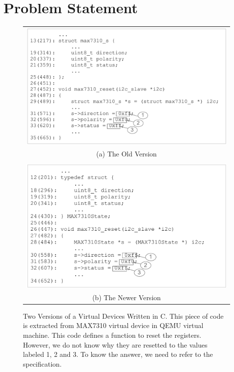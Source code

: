 \section{Problem Statement}
\label{sec:problem}

\begin{figure}[h!]
  \begin{center}
    \begin{tabular}{c}
\begin{minipage}[b]{\linewidth}
  \centering
  \includegraphics[width=0.95\linewidth]{code1}
\end{minipage}\\
(a) The Old Version\\
\\
\begin{minipage}[b]{\linewidth}
  \centering
  \includegraphics[width=0.95\linewidth]{code2}
\end{minipage}\\
(b) The Newer Version
\end{tabular}
  \caption{Two Versions of a Virtual Devices Written in C. This piece of code is extracted from MAX7310 virtual device in QEMU virtual machine. This code defines a function to reset the registers. However, we do not know why they are resetted to the values labeled 1, 2 and 3. To know the answer, we need to refer to the specification.}
\label{fig:code}
\end{center}
\end{figure}

